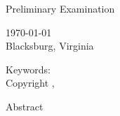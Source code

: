 \documentclass[12pt]{report}
\renewcommand\[{\begin{equation}}
\renewcommand\]{\end{equation}}
\begin{document}
\thispagestyle{empty}


\begin{center}

{\Large
\mytitle
}
\vfill


\myauthor
\vfill

Preliminary Examination
\vfill

\mycommittee
\vfill

\ifx\mydate\undefined
\def\mydate{\today}
\fi
\mydate \\
\ifx\mydefenselocation\undefined
Blacksburg, Virginia
\else
\fi

\vfill

\ifx\myyear\undefined
\def\myyear{\the\year}
\fi

Keywords: \mykeywords \\
Copyright \myyear, \myauthor

\end{center}

\pagebreak

\ifdefined \myabstract
\thispagestyle{empty}

\begin{center}
  {\large \mytitle}
  \vfill

  \myauthor
  \vfill

  Abstract
  \vfill
\end{center}


\fi

\ifx\mygrants\undefined
\else
  \mygrants
  \pagebreak
\fi

\tableofcontents
\pagebreak


\listoffigures
\pagebreak


\listoftables
\pagebreak

\ifdefined\myglossary

\printglossaries
\pagebreak
\fi


\pagestyle{myheadings}

\ifx\mylinespace\undefined
\else
  \mylinespace
\fi
\end{document}
